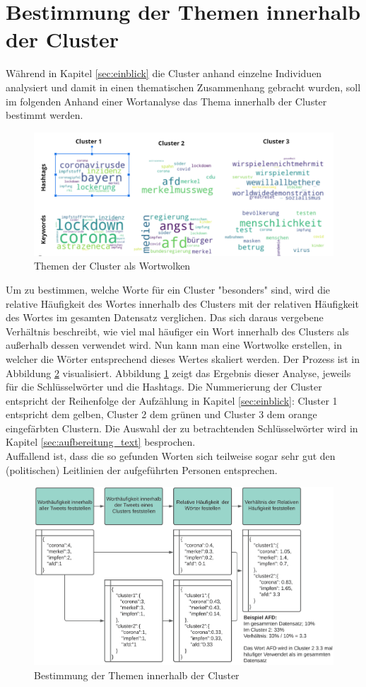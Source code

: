 \section{Bestimmung der Themen innerhalb der Cluster}
\label{sec:topics}
Während in Kapitel \ref{sec:einblick} die Cluster anhand einzelne Individuen analysiert und damit in einen thematischen Zusammenhang gebracht wurden, soll im folgenden Anhand einer Wortanalyse das Thema innerhalb der Cluster bestimmt werden.
\begin{figure}[h]
	\centering
	\includegraphics[width=\linewidth]{images/cluster_topics}
	\caption{Themen der Cluster als Wortwolken}
	\label{fig:topics}
\end{figure}
\newline
Um zu bestimmen, welche Worte für ein Cluster "besonders" sind, wird die relative Häufigkeit des Wortes innerhalb des Clusters mit der relativen Häufigkeit des Wortes im gesamten Datensatz verglichen. Das sich daraus vergebene Verhältnis beschreibt, wie viel mal häufiger ein Wort innerhalb des Clusters als außerhalb dessen verwendet wird. Nun kann man eine Wortwolke erstellen, in welcher die Wörter entsprechend dieses Wertes skaliert werden. Der Prozess ist in Abbildung \ref{fig:prozess_topics} visualisiert. Abbildung \ref{fig:topics} zeigt das Ergebnis dieser Analyse, jeweils für die Schlüsselwörter und die Hashtags. Die Nummerierung der Cluster entspricht der Reihenfolge der Aufzählung in Kapitel \ref{sec:einblick}: Cluster 1 entspricht dem gelben, Cluster 2 dem grünen und Cluster 3 dem orange eingefärbten Clustern. Die Auswahl der zu betrachtenden Schlüsselwörter wird in Kapitel \ref{sec:aufbereitung_text} besprochen. \\ \newline
Auffallend ist, dass die so gefunden Worten sich teilweise sogar sehr gut den (politischen) Leitlinien der aufgeführten Personen entsprechen.
\begin{figure}[h]
	\centering
	\includegraphics[width=\linewidth]{images/getting_cluster_topics}
	\caption{Bestimmung der Themen innerhalb der Cluster}
	\label{fig:prozess_topics}
\end{figure}





